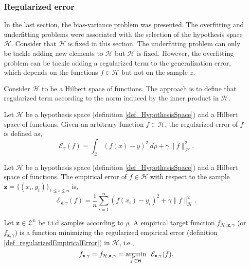 
\subsubsection{Regularized error} \label{sec_regularizedError}

In the last section, the bias-variance problem was presented. The overfitting and underfitting problems were associated with the selection of the hypothesis space $\mathcal{H}$. Consider that $\mathcal{H}$ is fixed in this section. The underfitting problem can only be tackle adding new elements to $\mathcal{H}$ but $\mathcal{H}$ is fixed. However, the overfitting problem can be tackle adding a regularized term to the generalization error, which depends on the functions $f \in \mathcal{H}$ but not on the sample $z$.

Consider $\mathcal{H}$ to be a Hilbert space of functions. The approach is to define that regularized term according to the norm induced by the inner product in $\mathcal{H}$.



\begin{definition}  \label{def_regularizedError}
Let $\mathcal{H}$ be a hypothesis space (definition \ref{def_HypothesisSpace}) and a Hilbert space of functions. Given an arbitrary function $f \in \mathcal{H}$, the regularized error of $f$ is defined as,
\begin{equation*} %
  \mathcal{E}_{\gamma}(f) = \int_{\mathcal{Z}} (f(x)-y)^2 \ d\rho + \gamma \|f\|^2_{\mathcal{H}}.
\end{equation*}
\end{definition}

\begin{definition}  \label{def_regularizedEmpiricalError}
Let $\mathcal{H}$ be a hypothesis space (definition \ref{def_HypothesisSpace}) and a Hilbert space of functions. The empirical error of $f \in \mathcal{H}$ with respect to the sample $\pmb{z} = \{(x_i,y_i)\}_{1 \leq i \leq n}$ is,
\begin{equation*}
  \mathcal{E}_{\pmb{z},\gamma}(f) = \frac{1}{n} \sum_{i=1}^{n} (f(x_i)-y_i)^2 + \gamma \|f\|^2_{\mathcal{H}}.
\end{equation*}
\end{definition}

\begin{definition}
  Let $\pmb{z} \in \mathcal{Z}^n$ be i.i.d samples according to $\rho$. A empirical target function $f_{\mathcal{H},\pmb{z},\gamma}$ (or $f_{\pmb{z},\gamma}$) is a function minimizing the regularized empirical error (definition \ref{def_regularizedEmpiricalError}) in $\mathcal{H}$, i.e.,
  \begin{equation} \label{eq_optimazerReguralizedEmpiricalError}
    f_{\pmb{z},\gamma} = f_{\mathcal{H},\pmb{z},\gamma} = \underset{f \in \mathcal{H}}{\textup{argmin}} \ \ \mathcal{E}_{\pmb{z},\gamma}(f).
  \end{equation}
\end{definition}


